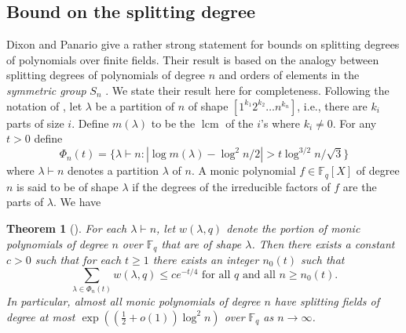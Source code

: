 \documentclass[11pt]{article}
\theoremstyle{plain}
\newtheorem{theorem}{Theorem}
\theoremstyle{definition}
\newcommand{\abs}[1]{\left\vert#1\right\vert}
\DeclareMathOperator{\lcm}{lcm} %
\def\F{\ensuremath{\mathbb{F}}}
\begin{document}




\begin{appendices}
	
\section{Bound on the splitting degree}
\label{sec:bound-splt}

Dixon and Panario \cite{dixon2004degree} give a rather strong statement for bounds on splitting 
degrees of polynomials over finite fields. Their result is based on the analogy between splitting 
degrees of polynomials of degree $n$ and orders of elements in the \textit{symmetric group} $S_n$ 
\cite{erdos1965some, erdos1967some}. We state their result here for completeness. Following the 
notation of \cite{dixon2004degree}, let $\lambda$ be a partition of $n$ of shape $[1^{k_1} 2^{k_2} 
\dots n^{k_n}]$, i.e., there are $k_i$ parts of size $i$. Define $m(\lambda)$ to be the $\lcm$ of 
the $i$'s where $k_i \ne 0$. For any $t > 0$ define 
\[ \Phi_n(t) = \{ \lambda \vdash n : \abs{\log m(\lambda) - \log^2n / 2} > t\log^{3/2}n / \sqrt{3} 
\} \]
where $\lambda \vdash n$ denotes a partition $\lambda$ of $n$. A monic polynomial $f \in \F_q[X]$ of 
degree $n$ is said to be of shape $\lambda$ if the degrees of the irreducible factors of $f$ are the 
parts of $\lambda$. We have
\begin{theorem}[{\cite[Theorem 1]{dixon2004degree}}]
	\label{thm:split-order}
	For each $\lambda \vdash n$, let $w(\lambda, q)$ denote the portion of monic polynomials of 
	degree $n$ over $\F_q$ that are of shape $\lambda$. Then there exists a constant $c > 0$ such 
	that for each $t \ge 1$ there exists an integer $n_0(t)$ such that 
	\[ \sum_{\lambda \in \Phi_n(t)} w(\lambda, q) \le ce^{-t / 4} \text{ for all } q \text{ and 
	all } n \ge n_0(t). \]
	In particular, almost all monic polynomials of degree $n$ have splitting fields of degree at 
	most $\exp((\frac{1}{2} + o(1))\log^2n)$ over $\F_q$ as $n \to \infty$.
\end{theorem}
	

\end{appendices}
\end{document}
